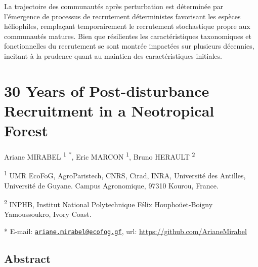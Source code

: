 \documentclass[
  11pt,
  french,
  A4paper,
  extrafontsizes,onecolumn,openright
  ]{memoir}
\begin{document}
La trajectoire des communautés après perturbation est déterminée par
l'émergence de processus de recrutement déterministes favorisant les
espèces héliophiles, remplaçant temporairement le recrutement
stochastique propre aux communautés matures. Bien que résilientes les
caractéristiques taxonomiques et fonctionnelles du recrutement se sont
montrée impactées sur plusieurs décennies, incitant à la prudence quant
au maintien des caractéristiques initiales.

\newpage

\section{30 Years of Post-disturbance Recruitment in a Neotropical
Forest}\label{years-of-post-disturbance-recruitment-in-a-neotropical-forest}

Ariane MIRABEL \textsuperscript{1} \textsuperscript{*}, Eric MARCON
\textsuperscript{1}, Bruno HERAULT \textsuperscript{2} \newline

\textsuperscript{1} UMR EcoFoG, AgroParistech, CNRS, Cirad, INRA,
Université des Antilles, Université de Guyane. Campus Agronomique, 97310
Kourou, France.

\textsuperscript{2} INPHB, Institut National Polytechnique Félix
Houphoüet-Boigny Yamoussoukro, Ivory Coast. \newline

* E-mail:
\href{mailto:ariane.mirabel@ecofog.gf}{\nolinkurl{ariane.mirabel@ecofog.gf}},
url: \url{https://github.com/ArianeMirabel}

\subsection{Abstract}\label{abstract-2}
\end{document}
